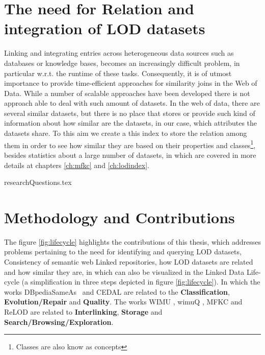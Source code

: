 \section{The need for Relation and integration of LOD datasets}
Linking and integrating entries across heterogeneous data sources such as databases or knowledge bases, becomes an increasingly difficult problem, in particular w.r.t. the runtime of these tasks. Consequently, it is of utmost importance to provide time-efficient approaches for similarity joins in the Web of Data. While a number of scalable approaches have been developed there is not approach able to deal with such amount of datasets. In the web of data, there are several similar datasets, but there is no place that stores or provide such kind of information about how similar are the datasets, in our case, which attributes the datasets share. To this aim we create a this index\cite{valdestilhas2019ReLOD} to store the relation among them in order to see how similar they are based on their properties and classes\footnote{Classes are also know as concepts}, besides statistics about a large number of datasets, in which are covered in more details at chapters \ref{ch:mfkc} and \ref{ch:lodindex}.

{researchQuestions.tex}

\section{Methodology and Contributions}
The figure \ref{fig:lifecycle} highlights the contributions of this thesis, which addresses
problems pertaining to the need for identifying and querying LOD datasets, Consistency of semantic web Linked repositories, how LOD datasets are related and how similar they are, in which can also be visualized in the Linked Data Life-cycle \cite{AUE+11} (a simplification in three steps depicted in figure \ref{fig:lifecycle}). In which the works DBpediaSameAs~\cite{valdestilhasdbpediasameas} and CEDAL \cite{valdestilhas2017cedal} are related to the \textbf{Classification}, \textbf{Evolution/Repair} and \textbf{Quality}. The works WIMU \cite{valdestilhas2018my}, wimuQ \cite{ValdestilhasKcap}, MFKC  \cite{valdestilhas2017high} and ReLOD \cite{valdestilhas2019ReLOD} are related to \textbf{Interlinking}, \textbf{Storage} and \textbf{Search/Browsing/Exploration}.

